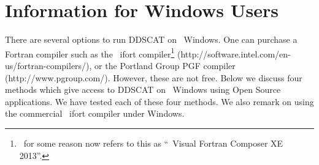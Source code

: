 %
%







\section{\label{sec:windows}
         Information for Windows Users}

There are several options to run DDSCAT on \Microsoft\ Windows. 
One can purchase a
Fortran compiler such as the \Intel\ ifort compiler\footnote{%
   \Intel\ for some reason now refers to this as
   ``\Intel\ Visual Fortran Composer XE 2013''.} 
(http://software.intel.com/en-us/fortran-compilers/), or
the Portland Group PGF compiler (http://www.pgroup.com/).
However, these are not free. Below we discuss four methods which
give access to DDSCAT on \Microsoft\ Windows 
using Open Source applications. We have
tested each of these four methods.
We also remark on using the commercial \Intel\ ifort compiler under Windows.

